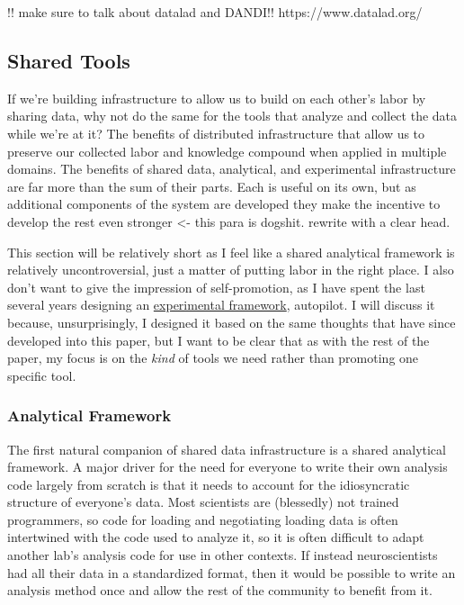 \documentclass{article}
\begin{document}
!! make sure to talk about datalad and DANDI!! https://www.datalad.org/

\hypertarget{shared-tools}{%
\subsection{Shared Tools}\label{shared-tools}}

If we're building infrastructure to allow us to build on each other's
labor by sharing data, why not do the same for the tools that analyze
and collect the data while we're at it? The benefits of distributed
infrastructure that allow us to preserve our collected labor and
knowledge compound when applied in multiple domains. The benefits of
shared data, analytical, and experimental infrastructure are far more
than the sum of their parts. Each is useful on its own, but as
additional components of the system are developed they make the
incentive to develop the rest even stronger \textless- this para is
dogshit. rewrite with a clear head.

This section will be relatively short as I feel like a shared analytical
framework is relatively uncontroversial, just a matter of putting labor
in the right place. I also don't want to give the impression of
self-promotion, as I have spent the last several years designing an
\href{https://docs.auto-pi-lot.com}{experimental framework}, autopilot.
I will discuss it because, unsurprisingly, I designed it based on the
same thoughts that have since developed into this paper, but I want to
be clear that as with the rest of the paper, my focus is on the
\emph{kind} of tools we need rather than promoting one specific tool.

\hypertarget{analytical-framework}{%
\subsubsection{Analytical Framework}\label{analytical-framework}}

The first natural companion of shared data infrastructure is a shared
analytical framework. A major driver for the need for everyone to write
their own analysis code largely from scratch is that it needs to account
for the idiosyncratic structure of everyone's data. Most scientists are
(blessedly) not trained programmers, so code for loading and negotiating
loading data is often intertwined with the code used to analyze it, so
it is often difficult to adapt another lab's analysis code for use in
other contexts. If instead neuroscientists had all their data in a
standardized format, then it would be possible to write an analysis
method once and allow the rest of the community to benefit from it.
\end{document}
